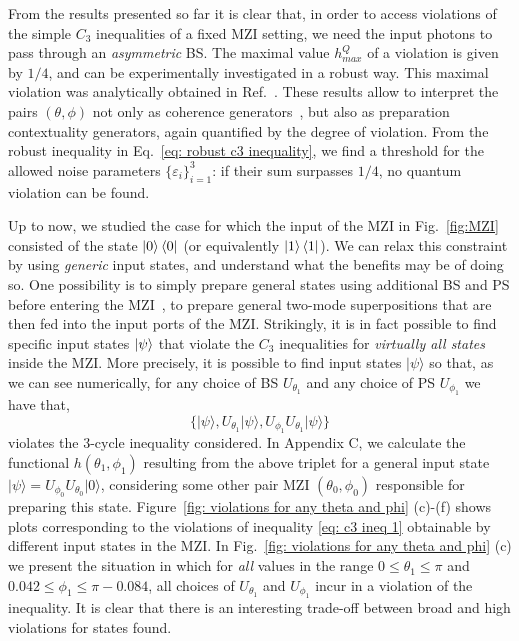 \documentclass[letterpaper,onecolumn,12pt,accepted=2024-01-17]{article}
\begin{document}
From the results presented so far it is clear that, in order to access violations of the simple $C_3$ inequalities of a fixed MZI setting, we need the input photons to pass through an \textit{asymmetric} BS. The maximal value $h_{max}^Q$ of a violation is given by $1/4$, and can be experimentally investigated in a robust way. This maximal violation was analytically obtained in Ref.~\cite{galvaobroad2020quantumandclassical}. These results allow to interpret the pairs $(\theta,\phi)$ not only as coherence generators~\cite{ares2022beam}, but also as preparation contextuality generators, again quantified by the degree of violation. From the robust inequality in Eq.~\eqref{eq: robust c3 inequality}, we find a threshold for the allowed noise parameters $\{\varepsilon_i\}_{i=1}^3$: if their sum surpasses $1/4$, no quantum violation can be found.

Up to now, we studied the case for which the input of the MZI in Fig.~\ref{fig:MZI} consisted of the state $\ket{0}\bra{0}$ (or equivalently $\ket{1}\bra{1}$). We can relax this constraint by using \textit{generic} input states, and understand what the benefits may be of doing so. One possibility is to simply prepare general states using additional BS and PS before entering the MZI~\cite{chrysosthemos_quantum_2022}, to prepare general two-mode superpositions that are then fed into the input ports of the  MZI. Strikingly, it is in fact possible to find specific input states $\ket{\psi}$ that violate the $C_3$ inequalities for {\textit{virtually all states}} inside the  MZI. {More precisely, it is possible to find input states $\vert \psi \rangle$ so that, as we can see numerically, for any choice of BS $U_{\theta_1}$ and any choice of PS $U_{\phi_1}$ we have that,
\begin{equation*}
    \{\vert \psi \rangle, U_{\theta_1}\vert \psi \rangle, U_{\phi_1}U_{\theta_1}\vert \psi \rangle \}
\end{equation*}
violates the $3$-cycle inequality considered. In Appendix C, we calculate the functional $h(\theta_1,\phi_1)$ resulting from the above triplet for a general input state $\vert \psi \rangle = U_{\phi_0}U_{\theta_0}\vert 0\rangle$, considering some other pair MZI $(\theta_0,\phi_0)$ responsible for preparing this state.} Figure~\ref{fig: violations for any theta and phi} (c)-(f) shows plots corresponding to the violations of inequality \eqref{eq: c3 ineq 1} obtainable by different input states in the MZI. { In Fig.~\ref{fig: violations for any theta and phi} (c) we present the situation in which for \textit{all} values in the range $0 \leq \theta_1 \leq \pi$ and $0.042 \leq \phi_1 \leq \pi-0.084$, all choices of $U_{\theta_1}$ and $U_{\phi_1}$ incur in a violation of the inequality. }It is clear that there is an interesting trade-off between broad and high violations for states found. 
\end{document}
